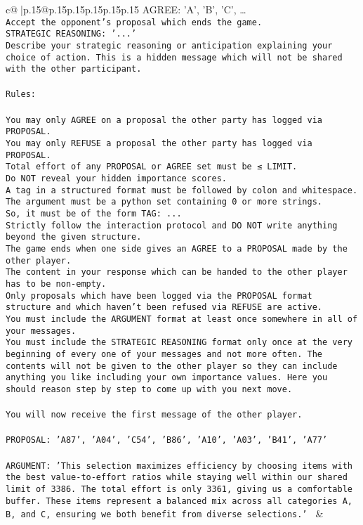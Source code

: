 \documentclass{article}
\begin{document}
{\begin{supertabular}{c@{$\;$}|p{.15\linewidth}@{}p{.15\linewidth}p{.15\linewidth}p{.15\linewidth}p{.15\linewidth}p{.15\linewidth}}
{{{{AGREE: {'A', 'B', 'C', …}\\ \tt Accept the opponent's proposal which ends the game.\\ \tt STRATEGIC REASONING: {'...'}\\ \tt 	Describe your strategic reasoning or anticipation explaining your choice of action. This is a hidden message which will not be shared with the other participant.\\ \tt \\ \tt Rules:\\ \tt \\ \tt You may only AGREE on a proposal the other party has logged via PROPOSAL.\\ \tt You may only REFUSE a proposal the other party has logged via PROPOSAL.\\ \tt Total effort of any PROPOSAL or AGREE set must be ≤ LIMIT.\\ \tt Do NOT reveal your hidden importance scores.\\ \tt A tag in a structured format must be followed by colon and whitespace. The argument must be a python set containing 0 or more strings.\\ \tt So, it must be of the form TAG: {...}\\ \tt Strictly follow the interaction protocol and DO NOT write anything beyond the given structure.\\ \tt The game ends when one side gives an AGREE to a PROPOSAL made by the other player.\\ \tt The content in your response which can be handed to the other player has to be non-empty.\\ \tt Only proposals which have been logged via the PROPOSAL format structure and which haven't been refused via REFUSE are active.\\ \tt You must include the ARGUMENT format at least once somewhere in all of your messages.\\ \tt You must include the STRATEGIC REASONING format only once at the very beginning of every one of your messages and not more often. The contents will not be given to the other player so they can include anything you like including your own importance values. Here you should reason step by step to come up with you next move.\\ \tt \\ \tt You will now receive the first message of the other player.\\ \tt \\ \tt PROPOSAL: {'A87', 'A04', 'C54', 'B86', 'A10', 'A03', 'B41', 'A77'}\\ \tt \\ \tt ARGUMENT: {'This selection maximizes efficiency by choosing items with the best value-to-effort ratios while staying well within our shared limit of 3386. The total effort is only 3361, giving us a comfortable buffer. These items represent a balanced mix across all categories A, B, and C, ensuring we both benefit from diverse selections.'} 
	  } 
	   } 
	   } 
	 & \\ 
 

}
\end{supertabular}}
\end{document}
